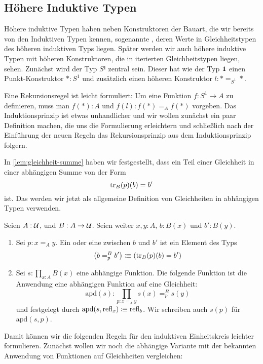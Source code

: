 \subsection{Höhere Induktive Typen}
\label{subsec:HITs}
Höhere induktive Typen haben neben Konstruktoren der Bauart, die wir bereits von den Induktiven Typen kennen, sogenannte ,
deren Werte in Gleichheitstypen des höheren induktiven Typs liegen.
Später werden wir auch höhere induktive Typen mit höheren Konstruktoren, die in iterierten Gleichheitstypen liegen, sehen.
Zunächst wird der Typ $S¹$ zentral sein. Dieser hat wie der Typ $\mathbf{1}$ einen Punkt-Konstruktor $\ast:S^1$ und zusätzlich einen
höheren Konstruktor $l:\ast =_{S^1}\ast$.

Eine Rekursionsregel ist leicht formuliert: Um eine Funktion $f:S^1\to A$ zu definieren, muss man $f(\ast):A$ und $f(l):f(\ast)=_A f(\ast)$ vorgeben.
Das Induktionsprinzip ist etwas unhandlicher und wir wollen zunächst ein paar Definition machen, die uns die Formulierung erleichtern und schließlich nach der Einführung der neuen Regeln
das Rekursionsprinzip aus dem Induktionsprinzip folgern.

In \cref{lem:gleichheit-summe} haben wir festgestellt, dass ein Teil einer Gleichheit in einer abhängigen Summe von der Form
\[
  \mathrm{tr}_B(p)(b)=b'
\]
ist. Das werden wir jetzt als allgemeine Definition von Gleichheiten in abhängigen Typen verwenden.
\begin{definition}
  Seien $A:\mathcal{U}$, und $B:A\to \mathcal{U}$. Seien weiter $x,y:A$, $b:B(x)$ und $b':B(y)$.
  \begin{enumerate}
  \item Sei $p:x=_A y$. Ein  oder eine  zwischen $b$ und $b'$ ist ein Element des Typs
    \[
      \left(b =_p^B b'\right)\vcentcolon\mspace{-1.2mu}\equiv \left(\mathrm{tr}_B(p)(b)=b'\right)
    \]
  \item Sei $s:\prod_{x:A}B(x)$ eine abhängige Funktion. Die folgende Funktion ist die Anwendung eine abhängigen Funktion auf eine Gleichheit:
    \[
      \mathrm{apd}(s):\prod_{p:x=_A y}s(x)=_p^B s(y)
    \]
    und festgelegt durch $\mathrm{apd}(s,\mathrm{refl}_x)\vcentcolon\mspace{-1.2mu}\equiv\mathrm{refl}_b$. Wir schreiben auch $s(p)$ für $\mathrm{apd}(s,p)$.
  \end{enumerate}
\end{definition}

Damit können wir die folgenden Regeln für den induktiven Einheitskreis leichter formulieren.
Zunächst wollen wir noch die abhängige Variante mit der bekannten Anwendung von Funktionen auf Gleichheiten vergleichen:

